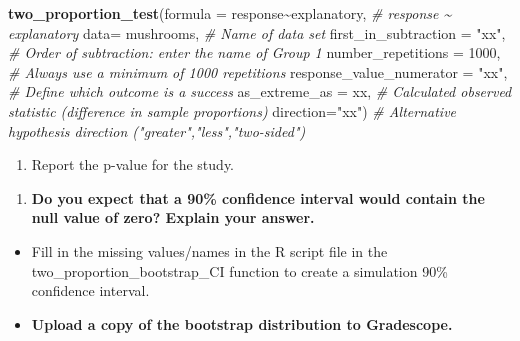 \documentclass[
]{report}
\newenvironment{Shaded}{\begin{snugshade}}{\end{snugshade}}
\newcommand{\AttributeTok}[1]{\textcolor[rgb]{0.13,0.29,0.53}{#1}}
\newcommand{\CommentTok}[1]{\textcolor[rgb]{0.56,0.35,0.01}{\textit{#1}}}
\newcommand{\DecValTok}[1]{\textcolor[rgb]{0.00,0.00,0.81}{#1}}
\newcommand{\FunctionTok}[1]{\textcolor[rgb]{0.13,0.29,0.53}{\textbf{#1}}}
\newcommand{\NormalTok}[1]{#1}
\newcommand{\SpecialCharTok}[1]{\textcolor[rgb]{0.81,0.36,0.00}{\textbf{#1}}}
\newcommand{\StringTok}[1]{\textcolor[rgb]{0.31,0.60,0.02}{#1}}
\providecommand{\tightlist}{%
  \setlength{\itemsep}{0pt}\setlength{\parskip}{0pt}}
\begin{document}
\begin{Shaded}
\begin{Highlighting}[]
\FunctionTok{two\_proportion\_test}\NormalTok{(}\AttributeTok{formula =}\NormalTok{ response}\SpecialCharTok{\textasciitilde{}}\NormalTok{explanatory, }\CommentTok{\# response \textasciitilde{} explanatory}
    \AttributeTok{data=}\NormalTok{ mushrooms, }\CommentTok{\# Name of data set}
    \AttributeTok{first\_in\_subtraction =} \StringTok{"xx"}\NormalTok{, }\CommentTok{\# Order of subtraction: enter the name of Group 1}
    \AttributeTok{number\_repetitions =} \DecValTok{1000}\NormalTok{, }\CommentTok{\# Always use a minimum of 1000 repetitions}
    \AttributeTok{response\_value\_numerator =} \StringTok{"xx"}\NormalTok{, }\CommentTok{\# Define which outcome is a success }
    \AttributeTok{as\_extreme\_as =}\NormalTok{ xx, }\CommentTok{\# Calculated observed statistic (difference in sample proportions)}
    \AttributeTok{direction=}\StringTok{"xx"}\NormalTok{) }\CommentTok{\# Alternative hypothesis direction ("greater","less","two{-}sided")}
\end{Highlighting}
\end{Shaded}

\begin{enumerate}
\def\labelenumi{\arabic{enumi}.}
\setcounter{enumi}{7}
\tightlist
\item
  Report the p-value for the study.
\end{enumerate}

\vspace{0.2in}

\begin{enumerate}
\def\labelenumi{\arabic{enumi}.}
\setcounter{enumi}{8}
\tightlist
\item
  \textbf{Do you expect that a 90\% confidence interval would contain the null value of zero? Explain your answer.}
\end{enumerate}

\vspace{0.8in}

\newpage

\begin{itemize}
\item
  Fill in the missing values/names in the R script file in the two\_proportion\_bootstrap\_CI function to create a simulation 90\% confidence interval.
\item
  \textbf{Upload a copy of the bootstrap distribution to Gradescope.}
\end{itemize}
\end{document}
